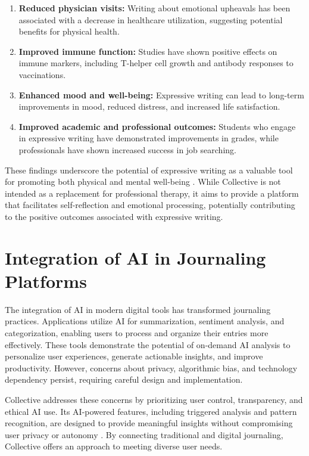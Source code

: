 \begin{enumerate}
	\item \textbf{Reduced physician visits:} Writing about emotional upheavals has been associated with a decrease in healthcare utilization, suggesting potential benefits for physical health.
	
	\item \textbf{Improved immune function:} Studies have shown positive effects on immune markers, including T-helper cell growth and antibody responses to vaccinations.
	
	\item \textbf{Enhanced mood and well-being:} Expressive writing can lead to long-term improvements in mood, reduced distress, and increased life satisfaction.
	
	\item \textbf{Improved academic and professional outcomes:} Students who engage in expressive writing have demonstrated improvements in grades, while professionals have shown increased success in job searching.
\end{enumerate}

These findings underscore the potential of expressive writing as a valuable tool for promoting both physical and mental well-being \cite{pennebaker1999forming}. While Collective is not intended as a replacement for professional therapy, it aims to provide a platform that facilitates self-reflection and emotional processing, potentially contributing to the positive outcomes associated with expressive writing.

\section{Integration of AI in Journaling Platforms}\label{sec:ai-integration}

The integration of AI in modern digital tools has transformed journaling practices. Applications utilize AI for summarization, sentiment analysis, and categorization, enabling users to process and organize their entries more effectively. These tools demonstrate the potential of on-demand AI analysis to personalize user experiences, generate actionable insights, and improve productivity. However, concerns about privacy, algorithmic bias, and technology dependency persist, requiring careful design and implementation.

Collective addresses these concerns by prioritizing user control, transparency, and ethical AI use. Its AI-powered features, including triggered analysis and pattern recognition, are designed to provide meaningful insights without compromising user privacy or autonomy \cite{allahyari2017text}. By connecting traditional and digital journaling, Collective offers an approach to meeting diverse user needs.

